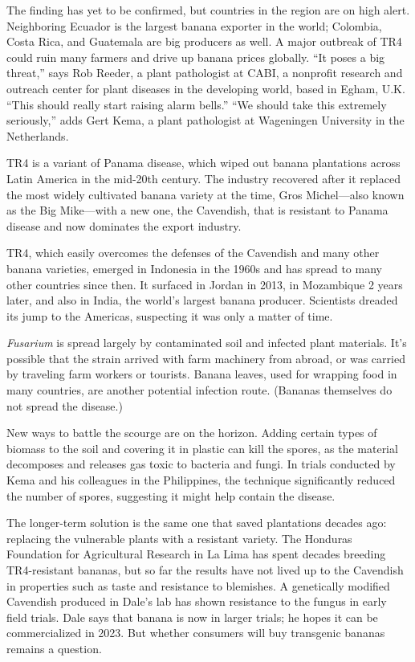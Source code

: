 \documentclass[
]{book}
\begin{document}
The finding has yet to be confirmed, but countries in the region are on high alert. Neighboring Ecuador is the largest banana exporter in the world; Colombia, Costa Rica, and Guatemala are big producers as well. A major outbreak of TR4 could ruin many farmers and drive up banana prices globally. ``It poses a big threat,'' says Rob Reeder, a plant pathologist at CABI, a nonprofit research and outreach center for plant diseases in the developing world, based in Egham, U.K. ``This should really start raising alarm bells.'' ``We should take this extremely seriously,'' adds Gert Kema, a plant pathologist at Wageningen University in the Netherlands.

TR4 is a variant of Panama disease, which wiped out banana plantations across Latin America in the mid-20th century. The industry recovered after it replaced the most widely cultivated banana variety at the time, Gros Michel---also known as the Big Mike---with a new one, the Cavendish, that is resistant to Panama disease and now dominates the export industry.

TR4, which easily overcomes the defenses of the Cavendish and many other banana varieties, emerged in Indonesia in the 1960s and has spread to many other countries since then. It surfaced in Jordan in 2013, in Mozambique 2 years later, and also in India, the world's largest banana producer. Scientists dreaded its jump to the Americas, suspecting it was only a matter of time.

\emph{Fusarium} is spread largely by contaminated soil and infected plant materials. It's possible that the strain arrived with farm machinery from abroad, or was carried by traveling farm workers or tourists. Banana leaves, used for wrapping food in many countries, are another potential infection route. (Bananas themselves do not spread the disease.)

New ways to battle the scourge are on the horizon. Adding certain types of biomass to the soil and covering it in plastic can kill the spores, as the material decomposes and releases gas toxic to bacteria and fungi. In trials conducted by Kema and his colleagues in the Philippines, the technique significantly reduced the number of spores, suggesting it might help contain the disease.

The longer-term solution is the same one that saved plantations decades ago: replacing the vulnerable plants with a resistant variety. The Honduras Foundation for Agricultural Research in La Lima has spent decades breeding TR4-resistant bananas, but so far the results have not lived up to the Cavendish in properties such as taste and resistance to blemishes. A genetically modified Cavendish produced in Dale's lab has shown resistance to the fungus in early field trials. Dale says that banana is now in larger trials; he hopes it can be commercialized in 2023. But whether consumers will buy transgenic bananas remains a question.
\end{document}
